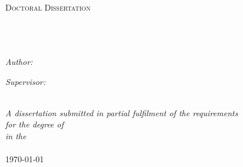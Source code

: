 \documentclass[11pt, oneside]{Thesis} %
\begin{document}
\begin{titlepage}
\begin{center}

\textsc{\LARGE \univname}\\[1.5cm] %
\textsc{\Large Doctoral Dissertation}\\[0.5cm] %

\HRule \\[0.4cm] %
{\LARGE \bfseries \ttitle }\\[0.4cm] %
\HRule \\[1.5cm] %
 
\begin{minipage}{0.4\textwidth}
\begin{flushleft} \large
\emph{Author: \authornames}\\
\end{flushleft}
\end{minipage}
\begin{minipage}{0.5\textwidth}
\begin{flushright} \large
\emph{Supervisor: \supname} \\
\end{flushright}
\end{minipage}\\[3cm]
 
\large \textit{A dissertation submitted in partial fulfilment of the requirements\\ for the degree of \degreename}\\[0.3cm] %
\textit{in the}\\[0.4cm]
\deptname\\[2cm] %
 
{\large \today}\\[4cm] %
 
\vfill
\end{center}

\end{titlepage}

\end{document}
